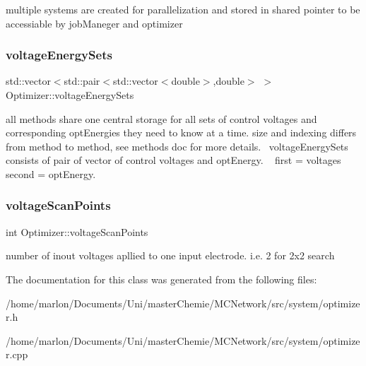 multiple systems are created for parallelization and stored in shared pointer to be accessiable by job\+Maneger and optimizer \mbox{\label{classOptimizer_ac4668dd4b83b15cb877daa134f55e5e2}} 
\subsubsection{\texorpdfstring{voltage\+Energy\+Sets}{voltageEnergySets}}
{\footnotesize\ttfamily std\+::vector$<$std\+::pair$<$std\+::vector$<$double$>$,double$>$ $>$ Optimizer\+::voltage\+Energy\+Sets\hspace{0.3cm}{\ttfamily [private]}}

all methods share one central storage for all sets of control voltages and corresponding opt\+Energies they need to know at a time. size and indexing differs from method to method, see methods doc for more details.~\newline
 voltage\+Energy\+Sets consists of pair of vector of control voltages and opt\+Energy. ~\newline
 first = voltages ~\newline
 second = opt\+Energy. \mbox{\label{classOptimizer_a884c041fbb25a872c72b5062823180b1}} 
\subsubsection{\texorpdfstring{voltage\+Scan\+Points}{voltageScanPoints}}
{\footnotesize\ttfamily int Optimizer\+::voltage\+Scan\+Points\hspace{0.3cm}{\ttfamily [private]}}

number of inout voltages apllied to one input electrode. i.\+e. 2 for 2x2 search 

The documentation for this class was generated from the following files\+:\begin{DoxyCompactItemize}
\item 
/home/marlon/\+Documents/\+Uni/master\+Chemie/\+M\+C\+Network/src/system/optimizer.\+h\item 
/home/marlon/\+Documents/\+Uni/master\+Chemie/\+M\+C\+Network/src/system/optimizer.\+cpp\end{DoxyCompactItemize}
